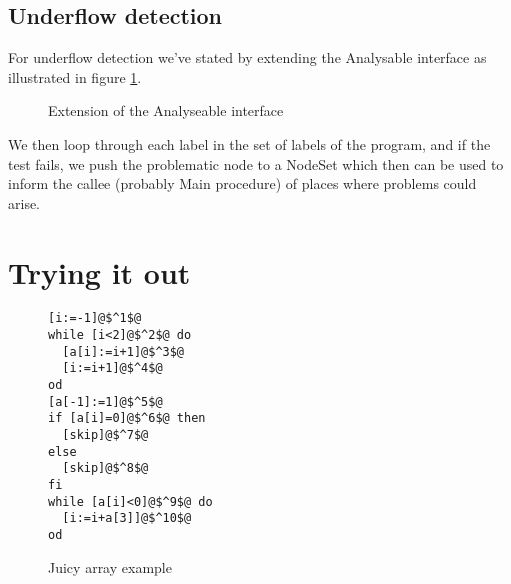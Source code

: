 \subsection{Underflow detection}

For underflow detection we've stated by extending the Analysable interface as illustrated in figure \ref{fig:analysable_underflow_extension}.
\begin{figure}
\centering
{}
\caption{Extension of the Analyseable interface}
\label{fig:analysable_underflow_extension}
\end{figure}

We then loop through each label in the set of labels of the program, and if the test fails, we push the problematic node to a NodeSet which then can be used to inform the callee (probably Main procedure) of places where problems could arise.




\section{Trying it out}
\begin{figure}
  \begin{lstlisting}
[i:=-1]@$^1$@
while [i<2]@$^2$@ do
  [a[i]:=i+1]@$^3$@
  [i:=i+1]@$^4$@
od
[a[-1]:=1]@$^5$@
if [a[i]=0]@$^6$@ then
  [skip]@$^7$@
else
  [skip]@$^8$@
fi
while [a[i]<0]@$^9$@ do
  [i:=i+a[3]]@$^10$@
od
 \end{lstlisting}
 \caption{Juicy array example}
\label{code:juicy_array_example}
\end{figure}

